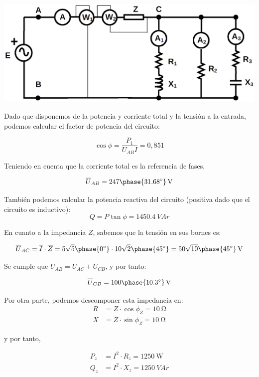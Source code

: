 \documentclass[12pt]{article}
\begin{document}
\begin{enumerate}
\begin{itemize}
\end{itemize}

\begin{center}
  \includegraphics[height=0.2\textheight]{figs/problema10}
\end{center}
Dado que disponemos de la potencia y corriente total y la tensión a
la entrada, podemos calcular el factor de potencia del circuito:

\[
\cos \phi = \frac{P_1}{U_{AB} I} = 0,851
\]

Teniendo en cuenta que la corriente total es la referencia de fases, 

\[
\overline{U}_{AB} = \SI[parse-numbers=false]{247 \phase{\ang{31.68}}}{\V}
\]

También podemos calcular la potencia reactiva del circuito
(positiva dado que el circuito es inductivo):
\[
Q = P \tan \phi = \SI{1450.4}{VA}r
\]


En cuanto a la impedancia $Z$, sabemos que la tensión en sus bornes
es:

\[
\overline{U}_{AC} = \overline{I} \cdot \overline{Z} =
5\sqrt{5}\phase{\ang{0}} \cdot 10\sqrt{2}\phase{\ang{45}} = \SI[parse-numbers=false]{50\sqrt{10}\phase{\ang{45}}}{\V}
\]

Se cumple que $\overline{U}_{AB} = \overline{U}_{AC} +
\overline{U}_{CB}$, y por tanto:

\[
\overline{U}_{CB} = \SI[parse-numbers=false]{100\phase{\ang{10.3}}}{\V}
\]

Por otra parte, podemos descomponer esta impedancia en:
\begin{align*}
  R &= Z \cdot \cos \phi_Z = \SI{10}{\ohm}\\
  X &= Z \cdot \sin \phi_Z = \SI{10}{\ohm}
\end{align*}

y por tanto,

\begin{align*}
P_z &= I^2 \cdot R_z = \SI{1250}{\watt}\\
Q_z &= I^2 \cdot X_z = \SI{1250}{VA}r
\end{align*}


\end{enumerate}
\end{document}
